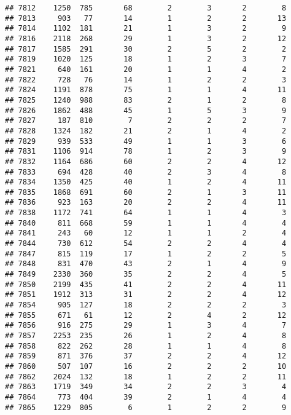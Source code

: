 \documentclass[]{article}
\begin{document}
\begin{verbatim}
## 7812    1250  785       68        2        3       2        8
## 7813     903   77       14        1        2       2       13
## 7814    1102  181       21        1        3       2        9
## 7816    2118  268       29        1        3       2       12
## 7817    1585  291       30        2        5       2        2
## 7819    1020  125       18        1        2       3        7
## 7821     640  161       20        1        1       4        2
## 7822     728   76       14        1        2       2        3
## 7824    1191  878       75        1        1       4       11
## 7825    1240  988       83        2        1       2        8
## 7826    1862  488       45        1        5       3        9
## 7827     187  810        7        2        2       2        7
## 7828    1324  182       21        2        1       4        2
## 7829     939  533       49        1        1       3        6
## 7831    1106  914       78        1        2       3        9
## 7832    1164  686       60        2        2       4       12
## 7833     694  428       40        2        3       4        8
## 7834    1350  425       40        1        2       4       11
## 7835    1868  691       60        2        1       3       11
## 7836     923  163       20        2        2       4       11
## 7838    1172  741       64        1        1       4        3
## 7840     811  668       59        1        1       4        4
## 7841     243   60       12        1        1       2        4
## 7844     730  612       54        2        2       4        4
## 7847     815  119       17        1        2       2        5
## 7848     831  470       43        2        1       4        9
## 7849    2330  360       35        2        2       4        5
## 7850    2199  435       41        2        2       4       11
## 7851    1912  313       31        2        2       4       12
## 7854     905  127       18        2        2       2        3
## 7855     671   61       12        2        4       2       12
## 7856     916  275       29        1        3       4        7
## 7857    2253  235       26        1        2       4        8
## 7858     822  262       28        1        1       4        8
## 7859     871  376       37        2        2       4       12
## 7860     507  107       16        2        2       2       10
## 7862    2024  132       18        1        2       2       11
## 7863    1719  349       34        2        2       3        4
## 7864     773  404       39        2        1       4        4
## 7865    1229  805        6        1        2       2        9

\end{verbatim}
\end{document}
